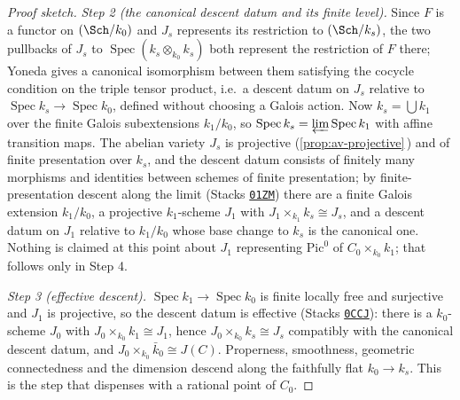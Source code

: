 \documentclass[11pt]{article}
\theoremstyle{plain}
\theoremstyle{definition}
\newcommand{\Pic}{\mathrm{Pic}}
\DeclareMathOperator{\Spec}{Spec}
\newcommand{\Cref}[1]{\hyperref[#1]{\ref{#1}}\,\hyperref[#1]{\nameref*{#1}}}
\begin{document}
\begin{proof}[Proof sketch]
\emph{Step 2 (the canonical descent datum and its finite level).}
Since $F$ is a functor on $(\Sch/k_0)$ and $J_s$ represents its
restriction to $(\Sch/k_s)$, the two pullbacks of $J_s$ to
$\Spec(k_s\otimes_{k_0}k_s)$ both represent the restriction of $F$
there; Yoneda gives a canonical isomorphism between them satisfying
the cocycle condition on the triple tensor product, i.e.\ a descent
datum on $J_s$ relative to $\Spec k_s\to\Spec k_0$, defined without
choosing a Galois action.  Now $k_s=\bigcup k_1$ over the finite Galois
subextensions $k_1/k_0$, so $\Spec k_s=\varprojlim\Spec k_1$ with
affine transition maps.  The abelian variety $J_s$ is projective
(\Cref{prop:av-projective}) and of finite presentation over $k_s$, and
the descent datum consists of finitely many morphisms and identities
between schemes of finite presentation;  by finite-presentation descent
along the limit (Stacks
\href{https://stacks.math.columbia.edu/tag/01ZM}{\texttt{01ZM}}) there
are a finite Galois extension $k_1/k_0$, a projective $k_1$-scheme
$J_1$ with $J_1\times_{k_1}k_s\cong J_s$, and a descent datum on $J_1$
relative to $k_1/k_0$ whose base change to $k_s$ is the canonical one.
Nothing is claimed at this point about $J_1$ representing $\Pic^0$ of
$C_0\times_{k_0}k_1$;  that follows only in Step 4.

\emph{Step 3 (effective descent).}  $\Spec k_1\to\Spec k_0$ is finite
locally free and surjective and $J_1$ is projective, so the descent
datum is effective (Stacks
\href{https://stacks.math.columbia.edu/tag/0CCJ}{\texttt{0CCJ}}):  there
is a $k_0$-scheme $J_0$ with $J_0\times_{k_0}k_1\cong J_1$, hence
$J_0\times_{k_0}k_s\cong J_s$ compatibly with the canonical descent
datum, and $J_0\times_{k_0}\bar k_0\cong J(C)$.  Properness, smoothness,
geometric connectedness and the dimension descend along the faithfully
flat $k_0\to k_s$.  This is the step that dispenses with a rational
point of $C_0$.


\end{proof}
\end{document}
